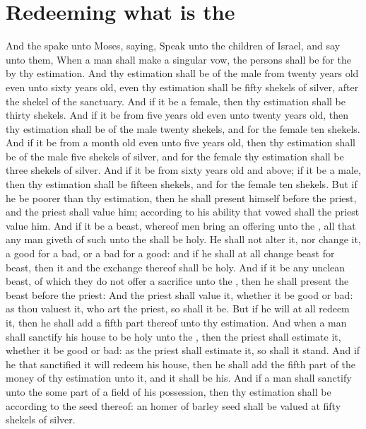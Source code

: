\section*{Redeeming what is the \LORDs}
\begin{biblechapter} %
\verse And the \LORD spake unto Moses, saying,
\verse Speak unto the children of Israel, and say unto them, When a man shall make a singular vow, the persons shall be for the \LORD by thy estimation.
\verse And thy estimation shall be of the male from twenty years old even unto sixty years old, even thy estimation shall be fifty shekels of silver, after the shekel of the sanctuary.
\verse And if it be a female, then thy estimation shall be thirty shekels.
\verse And if it be from five years old even unto twenty years old, then thy estimation shall be of the male twenty shekels, and for the female ten shekels.
\verse And if it be from a month old even unto five years old, then thy estimation shall be of the male five shekels of silver, and for the female thy estimation shall be three shekels of silver.
\verse And if it be from sixty years old and above; if it be a male, then thy estimation shall be fifteen shekels, and for the female ten shekels.
\verse But if he be poorer than thy estimation, then he shall present himself before the priest, and the priest shall value him; according to his ability that vowed shall the priest value him.
\verse And if it be a beast, whereof men bring an offering unto the \LORD, all that any man giveth of such unto the \LORD shall be holy.
\verse He shall not alter it, nor change it, a good for a bad, or a bad for a good: and if he shall at all change beast for beast, then it and the exchange thereof shall be holy.
\verse And if it be any unclean beast, of which they do not offer a sacrifice unto the \LORD, then he shall present the beast before the priest:
\verse And the priest shall value it, whether it be good or bad: as thou valuest it, who art the priest, so shall it be.
\verse But if he will at all redeem it, then he shall add a fifth part thereof unto thy estimation.
\verse And when a man shall sanctify his house to be holy unto the \LORD, then the priest shall estimate it, whether it be good or bad: as the priest shall estimate it, so shall it stand.
\verse And if he that sanctified it will redeem his house, then he shall add the fifth part of the money of thy estimation unto it, and it shall be his.
\verse And if a man shall sanctify unto the \LORD some part of a field of his possession, then thy estimation shall be according to the seed thereof: an homer of barley seed shall be valued at fifty shekels of silver.

\end{biblechapter}
